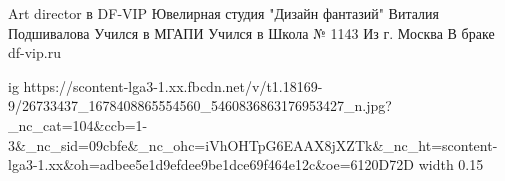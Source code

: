  
 
 
 
 

Art director в DF-VIP Ювелирная студия "Дизайн фантазий" Виталия Подшивалова
Учился в МГАПИ
Учился в Школа № 1143
Из г. Москва
В браке
df-vip.ru
\par
\ifcmt
  ig https://scontent-lga3-1.xx.fbcdn.net/v/t1.18169-9/26733437_1678408865554560_5460836863176953427_n.jpg?_nc_cat=104&ccb=1-3&_nc_sid=09cbfe&_nc_ohc=iVhOHTpG6EAAX8jXZTk&_nc_ht=scontent-lga3-1.xx&oh=adbee5e1d9efdee9be1dce69f464e12c&oe=6120D72D
  width 0.15
\fi

